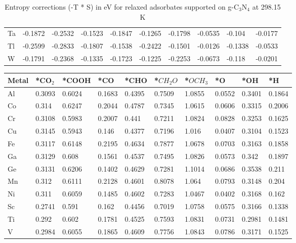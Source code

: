 \begin{table}[h]
{\begin{tabular}{*{10}{l}}
      Ta & -0.1872 & -0.2532 & -0.1523 & -0.1847 & -0.1265 & -0.1798 & -0.0535 & -0.104  & -0.0177 \\
      Tl & -0.2599 & -0.2833 & -0.1807 & -0.1538 & -0.2422 & -0.1501 & -0.0126 & -0.1338 & -0.0533 \\
      W  & -0.1791 & -0.2368 & -0.1335 & -0.1723 & -0.1225 & -0.2253 & -0.0673 & -0.118  & -0.0201 \\
      \hline
  \end{tabular}
  }
  \caption{Entropy corrections (-T * S) in eV for relaxed adsorbates supported on g-C$_3$N$_4$ at 298.15 K}
  \label{si_table8}
\end{table}


\begin{table}[h]
  \centering
  {\fontsize{6}{12}\selectfont
  \begin{tabular}{*{10}{l}}
      \hline
      Metal & *CO$_2$ & *COOH & *CO & *CHO & *$CH_2O$ & *$OCH_3$ & *O & *OH & *H          \\
      \hline
      Al & 0.3093 & 0.6024 & 0.1683 & 0.4395 & 0.7509 & 1.0855 & 0.0552 & 0.3401 & 0.1864 \\
      Co & 0.314  & 0.6247 & 0.2044 & 0.4787 & 0.7345 & 1.0615 & 0.0606 & 0.3315 & 0.2006 \\
      Cr & 0.3108 & 0.5983 & 0.2007 & 0.441  & 0.7211 & 1.0824 & 0.0828 & 0.3253 & 0.1625 \\
      Cu & 0.3145 & 0.5943 & 0.146  & 0.4377 & 0.7196 & 1.016  & 0.0407 & 0.3104 & 0.1523 \\
      Fe & 0.3117 & 0.6148 & 0.2195 & 0.4634 & 0.7877 & 1.0678 & 0.0703 & 0.3163 & 0.1858 \\
      Ga & 0.3129 & 0.608  & 0.1561 & 0.4537 & 0.7495 & 1.0826 & 0.0573 & 0.342  & 0.1897 \\
      Ge & 0.3131 & 0.6206 & 0.1402 & 0.4629 & 0.7281 & 1.1014 & 0.0686 & 0.3538 & 0.211  \\
      Mn & 0.312  & 0.6111 & 0.2128 & 0.4601 & 0.8078 & 1.064  & 0.0793 & 0.3148 & 0.204  \\
      Ni & 0.311  & 0.6059 & 0.1485 & 0.4602 & 0.7283 & 1.0467 & 0.0402 & 0.3168 & 0.162  \\
      Sc & 0.2741 & 0.591  & 0.162  & 0.4456 & 0.7019 & 1.0758 & 0.0575 & 0.3166 & 0.1338 \\
      Ti & 0.292  & 0.602  & 0.1781 & 0.4525 & 0.7593 & 1.0831 & 0.0731 & 0.2981 & 0.1481 \\
      V  & 0.2984 & 0.6055 & 0.1865 & 0.4609 & 0.7756 & 1.0843 & 0.0786 & 0.3171 & 0.1525 \\

\end{tabular}}
\end{table}
